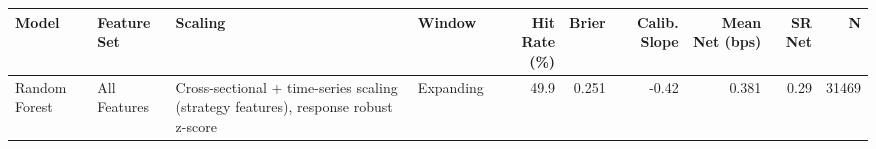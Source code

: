 \begin{tabular}{llllrrrrrr}
\toprule
Model & Feature Set & Scaling & Window & Hit Rate (\%) & Brier & Calib. Slope & Mean Net (bps) & SR Net & N \\
\midrule
Random Forest & All Features & Cross-sectional + time-series scaling (strategy features), response robust z-score & Expanding & 49.9 & 0.251 & -0.42 & 0.381 & 0.29 & 31469 \\
\bottomrule
\end{tabular}
